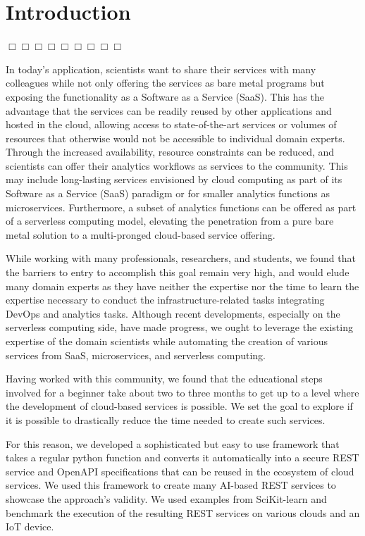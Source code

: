 
\newcommand{\Cloudmesh}{$\Box\Box\Box\Box\Box\Box\Box\Box\Box$}

\section{Introduction}

\Cloudmesh

In today's application, scientists want to share their services with many colleagues while not only offering the services as bare metal programs but exposing the functionality as a Software as a Service (SaaS). This has the advantage that the services can be readily reused by other applications and hosted in the cloud, allowing access to state-of-the-art services or volumes of resources that otherwise would not be accessible to individual domain experts. Through the increased availability, resource constraints can be reduced, and scientists can offer their analytics workflows as services to the community. This may include long-lasting services envisioned by cloud computing as part of its Software as a Service (SaaS) paradigm or for smaller analytics functions as microservices. Furthermore, a subset of analytics functions can be offered as part of a serverless computing model, elevating the penetration from a pure bare metal solution to a multi-pronged cloud-based service offering.

While working with many professionals, researchers, and students, we found that the barriers to entry to accomplish this goal remain very high, and would elude many domain experts as they have neither the expertise nor the time to learn the expertise necessary to conduct the infrastructure-related tasks integrating DevOps and analytics tasks. Although recent developments, especially on the serverless computing side, have made progress, we ought to leverage the existing expertise of the domain scientists while automating the creation of various services from SaaS, microservices, and serverless computing.

Having worked with this community, we found that the educational steps involved for a beginner take about two to three months to get up to a level where the development of cloud-based services is possible. We set the goal to explore if it is possible to drastically reduce the time needed to create such services.

For this reason, we developed a sophisticated but easy to use framework that takes a regular python function and converts it automatically into a secure REST service and OpenAPI specifications \cite{openapi} that can be reused in the ecosystem of cloud services. We used this framework to create many AI-based REST services to showcase the approach's validity. We used examples from SciKit-learn \cite{scikit-learn} and benchmark the execution of the resulting REST services on various clouds and an IoT device. 

